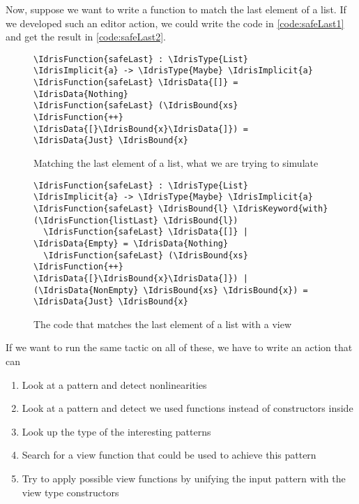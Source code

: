 Now, suppose we want to write a function to match the last element of a list.
If we developed such an \Elab editor action, we could write the code in
\autoref{code:safeLast1} and get the result in \autoref{code:safeLast2}.

\begin{figure}[ht]
\caption{Matching the last element of a list, what we are trying to simulate}
\label{code:safeLast1}
\begin{Verbatim}
\IdrisFunction{safeLast} : \IdrisType{List} \IdrisImplicit{a} -> \IdrisType{Maybe} \IdrisImplicit{a}
\IdrisFunction{safeLast} \IdrisData{[]} = \IdrisData{Nothing}
\IdrisFunction{safeLast} (\IdrisBound{xs} \IdrisFunction{++} \IdrisData{[}\IdrisBound{x}\IdrisData{]}) = \IdrisData{Just} \IdrisBound{x}
\end{Verbatim}
\end{figure}

\begin{figure}[ht]
\caption{The code that matches the last element of a list with a view}
\label{code:safeLast2}
\begin{Verbatim}
\IdrisFunction{safeLast} : \IdrisType{List} \IdrisImplicit{a} -> \IdrisType{Maybe} \IdrisImplicit{a}
\IdrisFunction{safeLast} \IdrisBound{l} \IdrisKeyword{with} (\IdrisFunction{listLast} \IdrisBound{l})
  \IdrisFunction{safeLast} \IdrisData{[]} | \IdrisData{Empty} = \IdrisData{Nothing}
  \IdrisFunction{safeLast} (\IdrisBound{xs} \IdrisFunction{++} \IdrisData{[}\IdrisBound{x}\IdrisData{]}) | (\IdrisData{NonEmpty} \IdrisBound{xs} \IdrisBound{x}) = \IdrisData{Just} \IdrisBound{x}
\end{Verbatim}
\end{figure}

If we want to run the same tactic on all of these, we have to write an \Elab action
that can
\begin{enumerate}
\item Look at a pattern and detect nonlinearities
\item Look at a pattern and detect we used functions instead of constructors inside
\item Look up the type of the interesting patterns
\item Search for a view function that could be used to achieve this pattern
\item Try to apply possible view functions by unifying the input pattern with the view type constructors
\end{enumerate}
